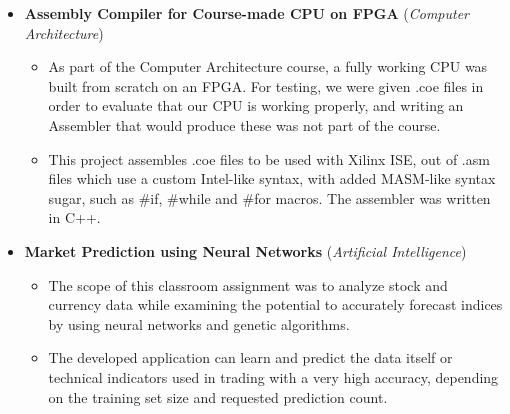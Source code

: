 \documentclass[11pt,a4paper,sans]{moderncv}
\begin{document}
\begin{itemize}
{\begin{itemize}
		\end{itemize}}
	\item	\label{arch}  \textbf{Assembly Compiler for Course-made CPU on FPGA} (\textit{Computer Architecture})
		{\small\begin{itemize}
		\item	As part of the Computer Architecture course, a fully working CPU was built from scratch on an FPGA. For testing, we were given .coe files in order to evaluate that our CPU is working properly, and writing an Assembler that would produce these was not part of the course.
		\item	This project assembles .coe files to be used with Xilinx ISE, out of .asm files which use a custom Intel-like syntax, with added MASM-like syntax sugar, such as \#if, \#while and \#for macros. The assembler was written in C++.
		\end{itemize}}
	\item	\label{pred}  \textbf{Market Prediction using Neural Networks} (\textit{Artificial Intelligence})
		{\small\begin{itemize}
		\item	The scope of this classroom assignment was to analyze stock and currency data while examining the potential to accurately forecast indices by using neural networks and genetic algorithms.
		\item	The developed application can learn and predict the data itself or technical indicators used in trading with a very high accuracy, depending on the training set size and requested prediction count.
		\end{itemize}}
	\end{itemize}
	
\end{document}
